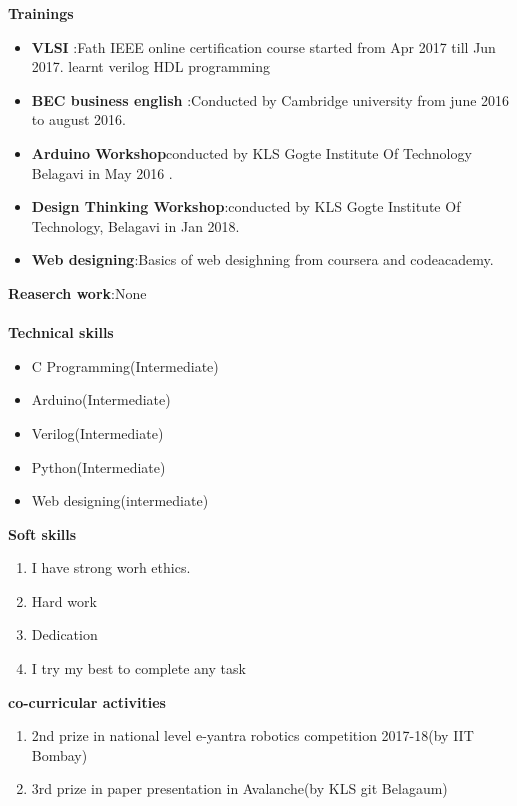 \documentclass{article}
\begin{document}
\textbf{Trainings}\\[0.1cm]
\begin{itemize}
\item\textbf{ VLSI }:Fath
IEEE online certification course started from  Apr 2017 till Jun 2017.
learnt verilog HDL programming
\item\textbf{BEC business english }:Conducted by Cambridge university from june 2016 to august 2016.
\item\textbf{Arduino Workshop}conducted by KLS Gogte Institute Of Technology Belagavi in 
May 2016 .
\item\textbf{Design Thinking Workshop}:conducted by KLS Gogte Institute Of Technology, Belagavi in Jan 2018.
\item\textbf{Web designing}:Basics of web desighning from coursera and codeacademy. \\
\end{itemize}
\textbf{Reaserch work}:None\\~\\
\textbf{Technical skills}\\
\begin{itemize}
\item C Programming(Intermediate)
\item Arduino(Intermediate)
\item Verilog(Intermediate)
\item Python(Intermediate)
\item Web designing(intermediate)\\
\end{itemize}
\textbf{Soft skills} \\
\begin{enumerate}
\item I have strong worh ethics.
\item Hard work
\item Dedication
\item I try my best to complete any  task\\
\end{enumerate}
\textbf{co-curricular activities}
\begin{enumerate}
\item 2nd prize in national level e-yantra robotics competition 2017-18(by IIT Bombay)
\item 3rd prize in paper presentation in Avalanche(by KLS git Belagaum)\\
\end{enumerate}
\end{document}
